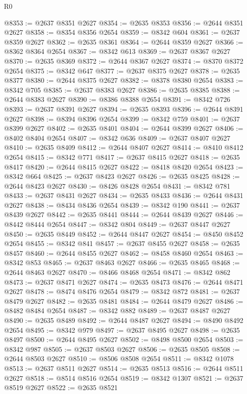 \begin{lexlean}{R0}
\begin{coremodule}
@8353 := @2637 @8351 @2627
@8354 := @2635 @8353
@8356 := @2644 @8351 @2627
@8358 := @8354 @8356 @2654
@8359 := @8342 @604
@8361 := @2637 @8359 @2627
@8362 := @2635 @8361
@8364 := @2644 @8359 @2627
@8366 := @8362 @8364 @2654
@8367 := @8342 @613
@8369 := @2637 @8367 @2627
@8370 := @2635 @8369
@8372 := @2644 @8367 @2627
@8374 := @8370 @8372 @2654
@8375 := @8342 @647
@8377 := @2637 @8375 @2627
@8378 := @2635 @8377
@8380 := @2644 @8375 @2627
@8382 := @8378 @8380 @2654
@8383 := @8342 @705
@8385 := @2637 @8383 @2627
@8386 := @2635 @8385
@8388 := @2644 @8383 @2627
@8390 := @8386 @8388 @2654
@8391 := @8342 @726
@8393 := @2637 @8391 @2627
@8394 := @2635 @8393
@8396 := @2644 @8391 @2627
@8398 := @8394 @8396 @2654
@8399 := @8342 @759
@8401 := @2637 @8399 @2627
@8402 := @2635 @8401
@8404 := @2644 @8399 @2627
@8406 := @8402 @8404 @2654
@8407 := @8342 @636
@8409 := @2637 @8407 @2627
@8410 := @2635 @8409
@8412 := @2644 @8407 @2627
@8414 := @8410 @8412 @2654
@8415 := @8342 @771
@8417 := @2637 @8415 @2627
@8418 := @2635 @8417
@8420 := @2644 @8415 @2627
@8422 := @8418 @8420 @2654
@8423 := @8342 @664
@8425 := @2637 @8423 @2627
@8426 := @2635 @8425
@8428 := @2644 @8423 @2627
@8430 := @8426 @8428 @2654
@8431 := @8342 @781
@8433 := @2637 @8431 @2627
@8434 := @2635 @8433
@8436 := @2644 @8431 @2627
@8438 := @8434 @8436 @2654
@8439 := @8342 @190
@8441 := @2637 @8439 @2627
@8442 := @2635 @8441
@8444 := @2644 @8439 @2627
@8446 := @8442 @8444 @2654
@8447 := @8342 @804
@8449 := @2637 @8447 @2627
@8450 := @2635 @8449
@8452 := @2644 @8447 @2627
@8454 := @8450 @8452 @2654
@8455 := @8342 @841
@8457 := @2637 @8455 @2627
@8458 := @2635 @8457
@8460 := @2644 @8455 @2627
@8462 := @8458 @8460 @2654
@8463 := @8342 @853
@8465 := @2637 @8463 @2627
@8466 := @2635 @8465
@8468 := @2644 @8463 @2627
@8470 := @8466 @8468 @2654
@8471 := @8342 @862
@8473 := @2637 @8471 @2627
@8474 := @2635 @8473
@8476 := @2644 @8471 @2627
@8478 := @8474 @8476 @2654
@8479 := @8342 @872
@8481 := @2637 @8479 @2627
@8482 := @2635 @8481
@8484 := @2644 @8479 @2627
@8486 := @8482 @8484 @2654
@8487 := @8342 @882
@8489 := @2637 @8487 @2627
@8490 := @2635 @8489
@8492 := @2644 @8487 @2627
@8494 := @8490 @8492 @2654
@8495 := @8342 @979
@8497 := @2637 @8495 @2627
@8498 := @2635 @8497
@8500 := @2644 @8495 @2627
@8502 := @8498 @8500 @2654
@8503 := @8342 @987
@8505 := @2637 @8503 @2627
@8506 := @2635 @8505
@8508 := @2644 @8503 @2627
@8510 := @8506 @8508 @2654
@8511 := @8342 @1078
@8513 := @2637 @8511 @2627
@8514 := @2635 @8513
@8516 := @2644 @8511 @2627
@8518 := @8514 @8516 @2654
@8519 := @8342 @1307
@8521 := @2637 @8519 @2627
@8522 := @2635 @8521

\end{coremodule}
\end{lexlean}
